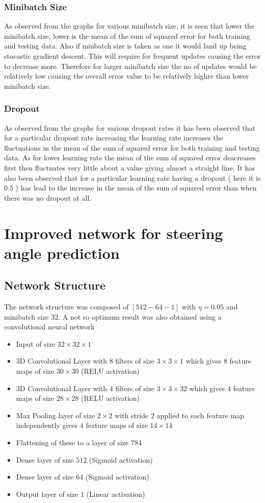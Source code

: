 \documentclass{article}
\begin{document}
\subsubsection{Minibatch Size}
As observed from the graphs for various minibatch size, it is seen that lower the minibatch size, lower is the mean of the sum of squared error for both training and testing data. Also if minbatch size is taken as one it would land up being stocastic gradient descent. This will require for frequent updates causing the error to decrease more. Therefore for larger minibatch size the no of updates would be relatively low causing the overall error value to be relatively highre than lower minibatch size.

\subsubsection{Dropout}
As observed from the graphs for various dropout rates it has been observed that for a particular dropout rate increasing the learning rate increases the fluctuations in the mean of the sum of squared error for both training and testing data. As for lower learning rate the mean of the sum of squared error deacreases first then fluctuates very little about a value giving almost a straight line. It has also been observed that for a particular learning rate having a dropout ( here it is $0.5$ ) has lead to the increase in the mean of the sum of squared error than when there was no dropout at all.

\section{Improved network for steering angle prediction}
\subsection{Network Structure}
The network structure was composed of $[512-64-1]$ with $\eta =0.05$ and minibatch size $32$. A not so optimum result was also obtained using a convolutional neural network
\begin{itemize}
\item Input of size $32\times32\times 1$
\item 3D Convolutional Layer with $8$ filters of size $3\times3\times1$ which gives $8$ feature maps of size $30\times30$ (RELU activation)
\item 3D Convolutional Layer with $4$ filters of size $3\times3\times32$ which gives $4$ feature maps of size $28\times28$ (RELU activation)
\item Max Pooling layer of size $2\times 2$ with stride $2$ applied to each feature map independently gives $4$ feature maps of size $14\times14$
\item Flattening of these to a layer of size $784$
\item Dense layer of size $512$ (Sigmoid activation)
\item Dense layer of size $64$ (Sigmoid activation)
\item Output layer of size $1$ (Linear activation)
\end{itemize}
\end{document}
